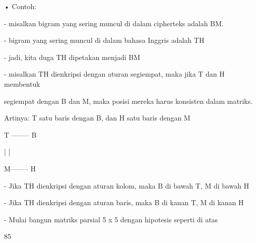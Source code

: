 \documentclass{article}
\begin{document}

• Contoh: 

    - misalkan bigram yang sering muncul di dalam cipherteks adalah BM. 

    - bigram yang sering muncul di dalam bahasa Inggris adalah TH

    - jadi, kita duga TH dipetakan menjadi BM

   - misalkan TH dienkripsi dengan aturan segiempat, maka jika T dan H membentuk 

segiempat dengan B dan M, maka posisi mereka harus konsisten dalam matriks.

     Artinya: T satu baris dengan B, dan H satu baris dengan M

                           T -------- B

                           |              |

                           M-------- H  

   - Jika TH dienkripsi dengan aturan kolom, maka B di bawah T, M di bawah H

   - Jika TH dienkripsi dengan aturan baris, maka B di kanan T, M di kanan H 

   - Mulai bangun matriks parsial 5 x 5 dengan hipotesis seperti di atas

85
\end{document}
